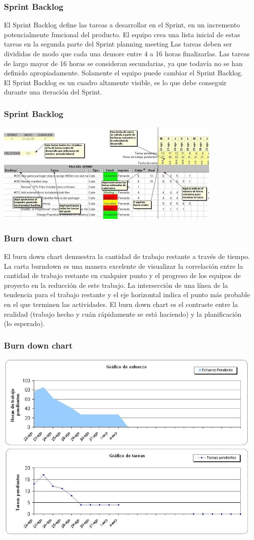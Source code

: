 \documentclass[12pt]{beamer}
\begin{document}
\begin{frame}
 \frametitle{Sprint Backlog}
 El Sprint Backlog define las tareas a desarrollar en el Sprint, en un  incremento potencialmente funcional del producto. El equipo crea una lista inicial de estas tareas en la segunda parte del Sprint planning meeting Las tareas deben ser divididas de modo que cada una demore entre 4 a 16 horas finalizarlas. Las tareas de largo mayor de 16 horas se consideran secundarias, ya que todavía no se han definido apropiadamente. Solamente el equipo puede cambiar el Sprint Backlog. El Sprint Backlog es un cuadro altamente visible, es lo que debe conseguir durante una iteración del Sprint. 
\end{frame}


\begin{frame}
 \frametitle{Sprint Backlog}
 \includegraphics[scale=0.5]{img/sprint_backlog.png}
\end{frame}


\begin{frame}
 \frametitle{Burn down chart}
 El burn down chart demuestra la cantidad de trabajo restante a través de tiempo. La carta burndown es una manera excelente de visualizar la correlación entre la cantidad de trabajo restante en cualquier punto y el progreso de los equipos de proyecto en la reducción de este trabajo. La intersección de una línea de la tendencia para el trabajo restante y el eje horizontal indica el punto más probable en el que terminen las actividades. El burn down chart es el contraste entre la realidad (trabajo hecho y cuán rápidamente se está haciendo) y la planificación (lo esperado).
\end{frame}


\begin{frame}
 \frametitle{Burn down chart}
 \includegraphics[scale=0.25]{img/bdc.png}
\end{frame}
\end{document}

